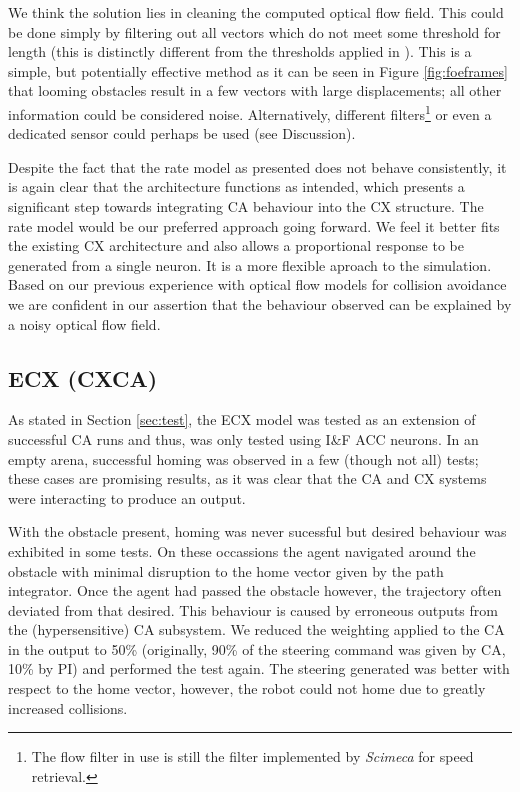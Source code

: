 \documentclass[a4paper,11pt,twoside,openright]{article}
\begin{document}
We think the solution lies in cleaning the computed optical flow
field. This could be done simply by filtering out all vectors which do
not meet some threshold for length (this is distinctly different from
the thresholds applied in \cite{Mitchell2018}). This is a simple, but
potentially effective method as it can be seen in Figure
\ref{fig:foeframes} that looming obstacles result in a few vectors
with large displacements; all other information could be considered
noise. Alternatively, different filters\footnote{The flow filter in
  use is still the filter implemented by \textit{Scimeca} for speed
  retrieval\cite{Scimeca2017,Mitchell2018}. } or even a dedicated
sensor could perhaps be used (see Discussion).\newline\par

Despite the fact that the rate model as presented does not behave
consistently, it is again clear that the architecture functions as
intended, which presents a significant step towards integrating CA
behaviour into the CX structure.  The rate model would be our
preferred approach going forward. We feel it better fits the existing
CX architecture and also allows a proportional response to be
generated from a single neuron. It is a more flexible aproach to the
simulation. Based on our previous experience with optical flow models
for collision avoidance we are confident in our assertion that the
behaviour observed can be explained by a noisy optical flow field.

\subsection{ECX (CXCA)}
As stated in Section \ref{sec:test}, the ECX model was tested as an
extension of successful CA runs and thus, was only tested using I\&F
ACC neurons. In an empty arena, successful homing was observed in a
few (though not all) tests; these cases are promising results, as it
was clear that the CA and CX systems were interacting to produce an
output. \newline\par

With the obstacle present, homing was never sucessful but desired
behaviour was exhibited in some tests. On these occassions the agent
navigated around the obstacle with minimal disruption to the home
vector given by the path integrator. Once the agent had passed the
obstacle however, the trajectory often deviated from that
desired. This behaviour is caused by erroneous outputs from the
(hypersensitive) CA subsystem. We reduced the weighting applied to the
CA in the output to 50\% (originally, 90\% of the steering command was
given by CA, 10\% by PI) and performed the test again. The steering
generated was better with respect to the home vector, however, the
robot could not home due to greatly increased collisions.
\newline\par
\end{document}
